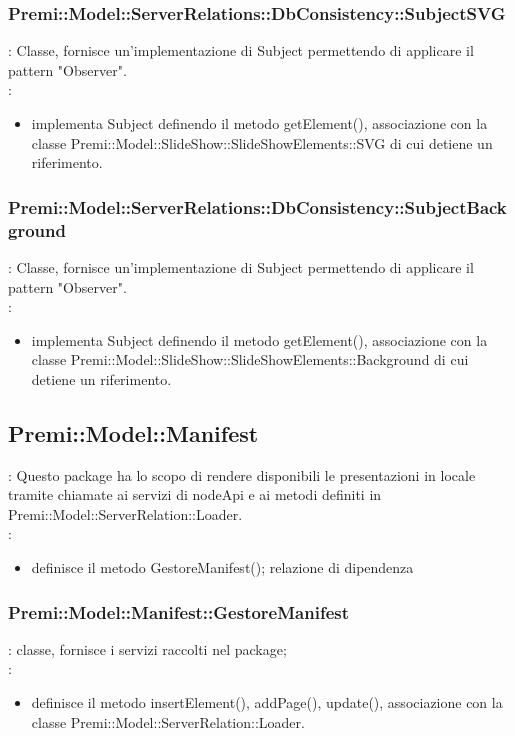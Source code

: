 {            \subsubsection{Premi::Model::ServerRelations::DbConsistency::SubjectSVG}{
				\textbf{\tipo}: Classe, fornisce un’implementazione di Subject permettendo di applicare il pattern "Observer".\\	
				\textbf{\relaz}: 
				\begin{itemize}
					\item implementa Subject definendo il metodo getElement(), associazione con la classe Premi::Model::SlideShow::SlideShowElements::SVG di cui detiene un riferimento.
				\end{itemize}	
            }
            
             \subsubsection{Premi::Model::ServerRelations::DbConsistency::SubjectBackground}{
				\textbf{\tipo}: Classe, fornisce un’implementazione di Subject permettendo di applicare il pattern "Observer".\\	
				\textbf{\relaz}: 
				\begin{itemize}
					\item implementa Subject definendo il metodo getElement(), associazione con la classe Premi::Model::SlideShow::SlideShowElements::Background di cui detiene un riferimento.
				\end{itemize}	
            }

}
\subsection{Premi::Model::Manifest}{
   	\textbf{\tipo}: Questo package ha lo scopo di rendere disponibili le presentazioni in locale tramite chiamate ai servizi di nodeApi e ai metodi definiti in Premi::Model::ServerRelation::Loader. \\
   	\textbf{\relaz}:
   	\begin{itemize}
   		\item definisce il metodo GestoreManifest(); relazione di dipendenza 
   	\end{itemize}

	\subsubsection{Premi::Model::Manifest::GestoreManifest}{
		\textbf{\tipo}: classe, fornisce i servizi raccolti nel package;\\
		\textbf{\relaz}:
		\begin{itemize}
			\item definisce il metodo insertElement(), addPage(), update(), associazione con la classe Premi::Model::ServerRelation::Loader.
		\end{itemize}
        }
}
